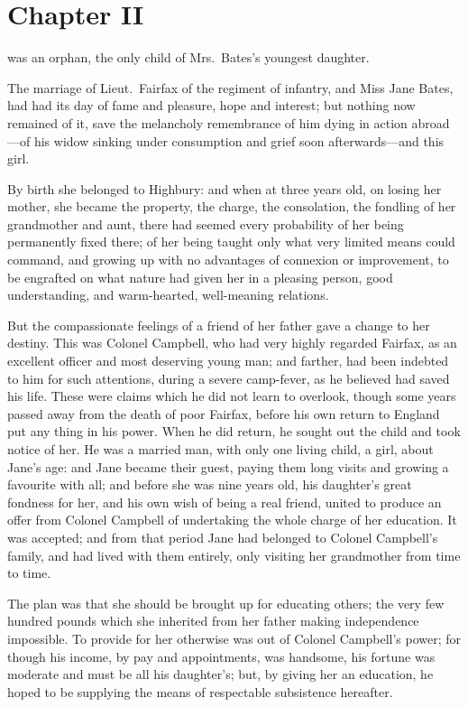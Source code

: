 \chapter{Chapter II}


 was an orphan, the only child of Mrs.\ Bates's
youngest daughter.

The marriage of Lieut.\ Fairfax of the \gdash{} regiment of infantry,
and Miss Jane Bates, had had its day of fame and pleasure,
hope and interest; but nothing now remained of it, save the melancholy
remembrance of him dying in action abroad---of his widow sinking
under consumption and grief soon afterwards---and this girl.

By birth she belonged to Highbury:  and when at three years old,
on losing her mother, she became the property, the charge,
the consolation, the fondling of her grandmother and aunt, there had
seemed every probability of her being permanently fixed there;
of her being taught only what very limited means could command,
and growing up with no advantages of connexion or improvement,
to be engrafted on what nature had given her in a pleasing person,
good understanding, and warm-hearted, well-meaning relations.

But the compassionate feelings of a friend of her father gave
a change to her destiny.  This was Colonel Campbell, who had
very highly regarded Fairfax, as an excellent officer and most
deserving young man; and farther, had been indebted to him for
such attentions, during a severe camp-fever, as he believed had saved
his life.  These were claims which he did not learn to overlook,
though some years passed away from the death of poor Fairfax,
before his own return to England put any thing in his power.
When he did return, he sought out the child and took notice of her.
He was a married man, with only one living child, a girl,
about Jane's age:  and Jane became their guest, paying them long visits
and growing a favourite with all; and before she was nine years old,
his daughter's great fondness for her, and his own wish of being
a real friend, united to produce an offer from Colonel Campbell
of undertaking the whole charge of her education.  It was accepted;
and from that period Jane had belonged to Colonel Campbell's family,
and had lived with them entirely, only visiting her grandmother
from time to time.

The plan was that she should be brought up for educating others;
the very few hundred pounds which she inherited from her father
making independence impossible.  To provide for her otherwise
was out of Colonel Campbell's power; for though his income, by pay
and appointments, was handsome, his fortune was moderate and must
be all his daughter's; but, by giving her an education, he hoped
to be supplying the means of respectable subsistence hereafter.

